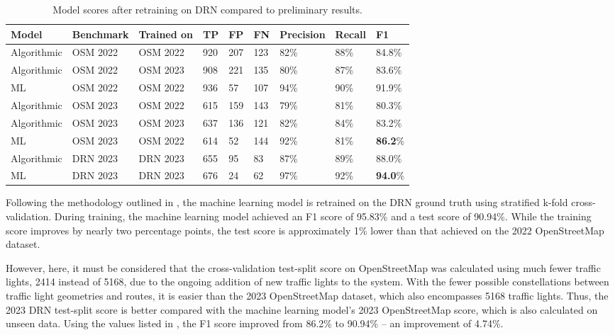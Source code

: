\begin{table}[t]
\caption{Model scores after retraining on DRN compared to preliminary results.}
\begin{tabular}{@{}lllllllll@{}}
\toprule
  \textbf{Model} & \textbf{Benchmark} & \textbf{Trained on} & \textbf{TP} & \textbf{FP} & \textbf{FN} & \textbf{Precision} & \textbf{Recall} & \textbf{F1} \\
  \midrule
  Algorithmic & OSM 2022 & OSM 2022 & 920 & 207 & 123 & 82\% & 88\% & 84.8\% \\
  Algorithmic & OSM 2022 & OSM 2023 & 908 & 221 & 135 & 80\% & 87\% & 83.6\% \\
  ML          & OSM 2022 & OSM 2022 & 936 & 57 & 107 & 94\% & 90\% & 91.9\% \\
  \midrule
  Algorithmic & OSM 2023 & OSM 2022 & 615 & 159 & 143 & 79\% & 81\% & 80.3\% \\
  Algorithmic & OSM 2023 & OSM 2023 & 637 & 136 & 121 & 82\% & 84\% & 83.2\% \\
  ML          & OSM 2023 & OSM 2022 & 614 & 52 & 144 & 92\% & 81\% & \textbf{86.2}\% \\
  \midrule
  Algorithmic & DRN 2023 & DRN 2023 & 655 & 95 & 83 & 87\% & 89\% & 88.0\% \\
  ML          & DRN 2023 & DRN 2023 & 676 & 24 & 62 & 97\% & 92\% & \textbf{94.0}\% \\
\bottomrule
\end{tabular}
\label{tab:model-scores-drn}
\end{table}

Following the methodology outlined in , the machine learning model is retrained on the DRN ground truth using stratified k-fold cross-validation. During training, the machine learning model achieved an F1 score of 95.83\% and a test score of 90.94\%. While the training score improves by nearly two percentage points, the test score is approximately 1\% lower than that achieved on the 2022 OpenStreetMap dataset. 

However, here, it must be considered that the cross-validation test-split score on OpenStreetMap was calculated using much fewer traffic lights, 2414 instead of 5168, due to the ongoing addition of new traffic lights to the system. With the fewer possible constellations between traffic light geometries and routes, it is easier than the 2023 OpenStreetMap dataset, which also encompasses 5168 traffic lights. Thus, the 2023 DRN test-split score is better compared with the machine learning model's 2023 OpenStreetMap score, which is also calculated on unseen data. Using the values listed in , the F1 score improved from 86.2\% to 90.94\% -- an improvement of 4.74\%. 

